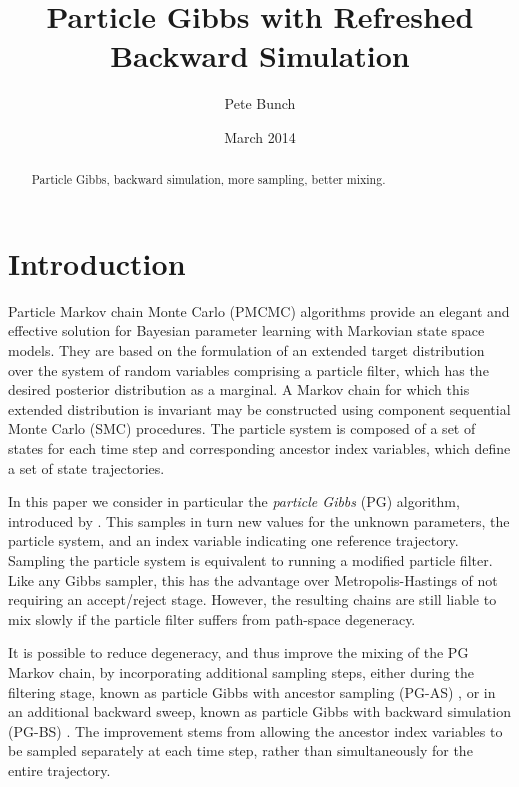 \documentclass{article}
\title{Particle Gibbs with Refreshed Backward Simulation}
\author{Pete Bunch}
\date{March 2014}
\begin{document}
\maketitle

\begin{abstract}
 Particle Gibbs, backward simulation, more sampling, better mixing.
\end{abstract}


\section{Introduction}
Particle Markov chain Monte Carlo (PMCMC) algorithms \citep{Andrieu2010,Olsson2011,Chopin2013,Lindsten2014} provide an elegant and effective solution for Bayesian parameter learning with Markovian state space models. They are based on the formulation of an extended target distribution over the system of random variables comprising a particle filter, which has the desired posterior distribution as a marginal. A Markov chain for which this extended distribution is invariant may be constructed using component sequential Monte Carlo (SMC) procedures. The particle system is composed of a set of states for each time step and corresponding ancestor index variables, which define a set of state trajectories.

In this paper we consider in particular the \emph{particle Gibbs} (PG) algorithm, introduced by \citep{Andrieu2010}. This samples in turn new values for the unknown parameters, the particle system, and an index variable indicating one reference trajectory. Sampling the particle system is equivalent to running a modified particle filter. Like any Gibbs sampler, this has the advantage over Metropolis-Hastings of not requiring an accept/reject stage. However, the resulting chains are still liable to mix slowly if the particle filter suffers from path-space degeneracy.

It is possible to reduce degeneracy, and thus improve the mixing of the PG Markov chain, by incorporating additional sampling steps, either during the filtering stage, known as particle Gibbs with ancestor sampling (PG-AS) \citep{Lindsten2014}, or in an additional backward sweep, known as particle Gibbs with backward simulation (PG-BS) \citep{Whiteley2010b,Lindsten2012}. The improvement stems from allowing the ancestor index variables to be sampled separately at each time step, rather than simultaneously for the entire trajectory.
\end{document}
